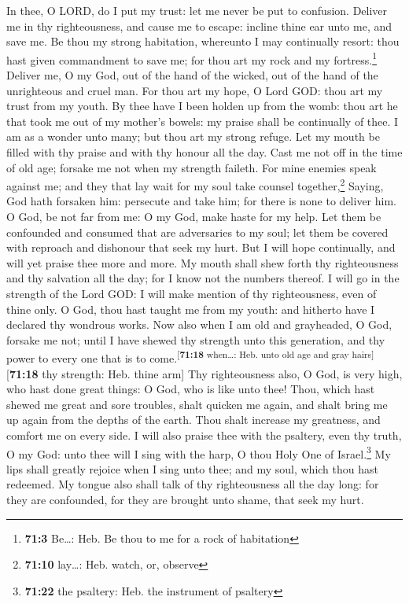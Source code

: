  In thee, O LORD, do I put my trust: let me never be put
to confusion.  Deliver me in thy righteousness, and cause
me to escape: incline thine ear unto me, and save me.  Be
thou my strong habitation, whereunto I may continually resort: thou hast
given commandment to save me; for thou art my rock and my
fortress.\footnote{\textbf{71:3} Be\ldots: Heb. Be thou to me for a rock
  of habitation}  Deliver me, O my God, out of the hand of
the wicked, out of the hand of the unrighteous and cruel man.
 For thou art my hope, O Lord GOD: thou art my trust from
my youth.  By thee have I been holden up from the womb:
thou art he that took me out of my mother's bowels: my praise shall be
continually of thee.  I am as a wonder unto many; but thou
art my strong refuge.  Let my mouth be filled with thy
praise and with thy honour all the day.  Cast me not off
in the time of old age; forsake me not when my strength faileth.
 For mine enemies speak against me; and they that lay
wait for my soul take counsel together,\footnote{\textbf{71:10}
  lay\ldots: Heb. watch, or, observe}  Saying, God hath
forsaken him: persecute and take him; for there is none to deliver him.
 O God, be not far from me: O my God, make haste for my
help.  Let them be confounded and consumed that are
adversaries to my soul; let them be covered with reproach and dishonour
that seek my hurt.  But I will hope continually, and will
yet praise thee more and more.  My mouth shall shew forth
thy righteousness and thy salvation all the day; for I know not the
numbers thereof.  I will go in the strength of the Lord
GOD: I will make mention of thy righteousness, even of thine only.
 O God, thou hast taught me from my youth: and hitherto
have I declared thy wondrous works.  Now also when I am
old and grayheaded, O God, forsake me not; until I have shewed thy
strength unto this generation, and thy power to every one that is to
come.\textsuperscript{{[}\textbf{71:18} when\ldots: Heb. unto old age
and gray hairs{]}}{[}\textbf{71:18} thy strength: Heb. thine arm{]}
 Thy righteousness also, O God, is very high, who hast
done great things: O God, who is like unto thee!  Thou,
which hast shewed me great and sore troubles, shalt quicken me again,
and shalt bring me up again from the depths of the earth.
 Thou shalt increase my greatness, and comfort me on
every side.  I will also praise thee with the psaltery,
even thy truth, O my God: unto thee will I sing with the harp, O thou
Holy One of Israel.\footnote{\textbf{71:22} the psaltery: Heb. the
  instrument of psaltery}  My lips shall greatly rejoice
when I sing unto thee; and my soul, which thou hast redeemed.
 My tongue also shall talk of thy righteousness all the
day long: for they are confounded, for they are brought unto shame, that
seek my hurt.


